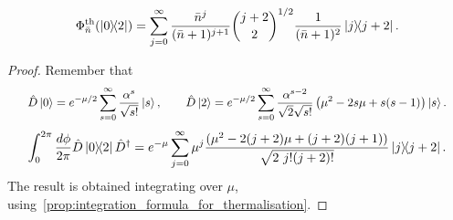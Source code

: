 \documentclass[12pt]{report}
\begin{document}
\begin{prop}\label{prop:thermalisation_applied_to_02}
	\begin{equation}
		\Phi_{\bar n}^{\rm th}(\ketbra{0}{2})
		= \sum_{j=0}^\infty
		\frac{\bar n^j}{(\bar n + 1)^{j+1}}
		\binom{j+2}{2}^{1/2}
		\frac{1}{(\bar n + 1)^2}
		\ketbra{j}{j+2}.
	\end{equation}
\end{prop}
\begin{proof}
	Remember that
	\begin{equation}\scalebox{0.92}{$\displaystyle
		\hat D\ket0 = e^{-\mu/2} \sum_{s=0}^\infty \frac{\alpha^s}{\sqrt{s!}} \ket s,
		\qquad
		\hat D\ket2 = e^{-\mu/2} \sum_{s=0}^\infty \frac{\alpha^{s-2}}{\sqrt2\sqrt{s!}}
		\left(\mu^2 - 2s \mu + s(s-1)\right) \ket s.
	$}\end{equation}
	\begin{equation}
	\begin{gathered}
		\int_0^{2\pi} \frac{d\phi}{2\pi}
		\hat D \ketbra{0}{2} \hat D^\dagger
		= e^{-\mu} \sum_{j=0}^\infty
		\mu^j\frac{(\mu^2 - 2 (j+2) \mu + (j+2)(j+1))}{\sqrt{2\,\,j!(j+2)!}}
		\ketbra{j}{j+2}.
	\end{gathered}
	\end{equation}
	The result is obtained integrating over $\mu$, using~\cref{prop:integration_formula_for_thermalisation}.
\end{proof}
\end{document}
